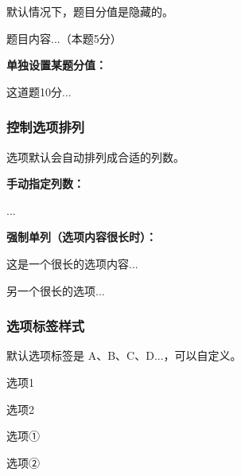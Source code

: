 默认情况下，题目分值是隐藏的。

\begin{latexcode}

  \begin{question}[points = 5]
    题目内容...（本题5分）
  \end{question}
\end{latexcode}

\textbf{单独设置某题分值：}

\begin{latexcode}
  \begin{question}[points = 10]
    这道题10分...
  \end{question}
\end{latexcode}

\subsubsection{控制选项排列}

选项默认会自动排列成合适的列数。

\textbf{手动指定列数：}

\begin{latexcode}

  \begin{choices}[columns = 4]  %
    \item ...
  \end{choices}
\end{latexcode}

\textbf{强制单列（选项内容很长时）：}

\begin{latexcode}
  \begin{choices}[columns = 1]
    \item 这是一个很长的选项内容...
    \item 另一个很长的选项...
  \end{choices}
\end{latexcode}

\subsubsection{选项标签样式}

默认选项标签是 A、B、C、D...，可以自定义。

\begin{latexcode}
  \begin{choices}[label = \arabic*.]
    \item 选项1
    \item 选项2
  \end{choices}

  \begin{choices}[label = \circlednumber*]
    \item 选项①
    \item 选项②
  \end{choices}
\end{latexcode}

